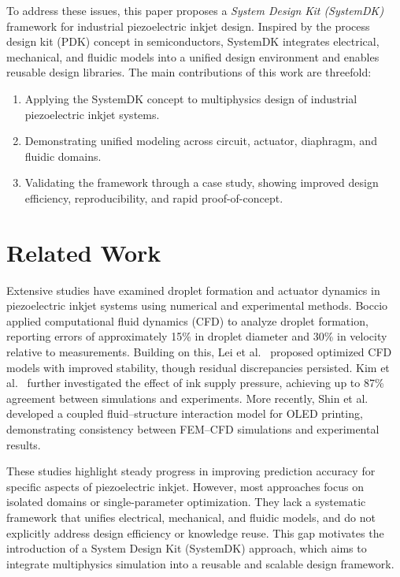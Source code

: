 \documentclass[conference]{IEEEtran}
\begin{document}
To address these issues, this paper proposes a \emph{System Design Kit (SystemDK)} framework for industrial piezoelectric inkjet design. 
Inspired by the process design kit (PDK) concept in semiconductors, SystemDK integrates electrical, mechanical, and fluidic models into a unified design environment and enables reusable design libraries. 
The main contributions of this work are threefold:
\begin{enumerate}
  \item Applying the SystemDK concept to multiphysics design of industrial piezoelectric inkjet systems.
  \item Demonstrating unified modeling across circuit, actuator, diaphragm, and fluidic domains.
  \item Validating the framework through a case study, showing improved design efficiency, reproducibility, and rapid proof-of-concept.
\end{enumerate}

\section{Related Work}
Extensive studies have examined droplet formation and actuator dynamics in piezoelectric inkjet systems using numerical and experimental methods. 
Boccio~\cite{boccio2003} applied computational fluid dynamics (CFD) to analyze droplet formation, reporting errors of approximately 15\% in droplet diameter and 30\% in velocity relative to measurements. 
Building on this, Lei et al.~\cite{lei2012} proposed optimized CFD models with improved stability, though residual discrepancies persisted. 
Kim et al.~\cite{kim2022} further investigated the effect of ink supply pressure, achieving up to 87\% agreement between simulations and experiments. 
More recently, Shin et al.~\cite{shin2025} developed a coupled fluid--structure interaction model for OLED printing, demonstrating consistency between FEM--CFD simulations and experimental results.

These studies highlight steady progress in improving prediction accuracy for specific aspects of piezoelectric inkjet. 
However, most approaches focus on isolated domains or single-parameter optimization. 
They lack a systematic framework that unifies electrical, mechanical, and fluidic models, and do not explicitly address design efficiency or knowledge reuse. 
This gap motivates the introduction of a System Design Kit (SystemDK) approach, which aims to integrate multiphysics simulation into a reusable and scalable design framework.
\end{document}
